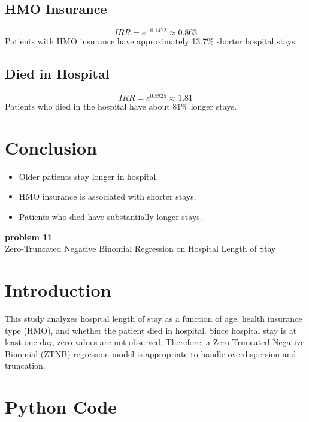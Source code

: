 \documentclass[12pt]{article}
\begin{document}
\subsection*{HMO Insurance}
\[ IRR = e^{-0.1472} \approx 0.863 \]
Patients with HMO insurance have approximately 13.7\% shorter hospital stays.

\subsection*{Died in Hospital}
\[ IRR = e^{0.5925} \approx 1.81 \]
Patients who died in the hospital have about 81\% longer stays.

\section*{Conclusion}

\begin{itemize}
    \item Older patients stay longer in hospital.
    \item HMO insurance is associated with shorter stays.
    \item Patients who died have substantially longer stays.
\end{itemize}

\newpage


\begin{center}
    {\LARGE \textbf{ problem 11}}\\[0.3cm]
    {\large Zero-Truncated Negative Binomial Regression on Hospital Length of Stay }
\end{center}




\section*{Introduction}

This study analyzes hospital length of stay as a function of age, health insurance type (HMO), and whether the patient died in hospital. Since hospital stay is at least one day, zero values are not observed. Therefore, a Zero-Truncated Negative Binomial (ZTNB) regression model is appropriate to handle overdispersion and truncation.

\section*{Python Code}
\end{document}
